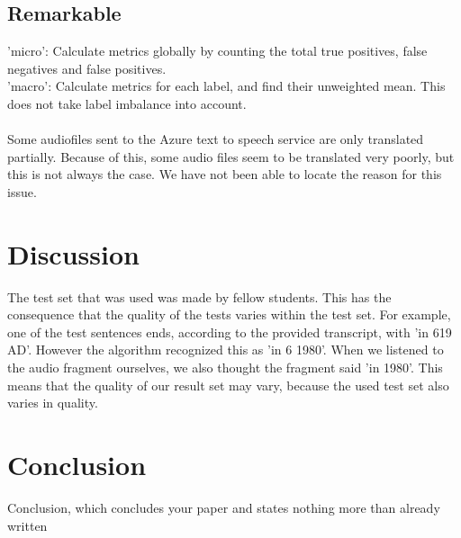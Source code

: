 \documentclass{article}
\begin{document}
\subsection{Remarkable}
    'micro': Calculate metrics globally by counting the total true positives, false negatives and false positives. \\
    'macro': Calculate metrics for each label, and find their unweighted mean. This does not take label imbalance into account. \\ \\
    Some audiofiles sent to the Azure text to speech service are only translated partially. Because of this, some audio files seem to be translated very poorly, but this is not always the case. We have not been able to locate the reason for this issue.

\section{Discussion}
The test set that was used was made by fellow students. This has the consequence that the quality of the tests varies within the test set. For example, one of the test sentences ends, according to the provided transcript, with 'in 619 AD'. However the algorithm recognized this as 'in 6 1980'. When we listened to the audio fragment ourselves, we also thought the fragment said 'in 1980'. This means that the quality of our result set may vary, because the used test set also varies in quality.

\section{Conclusion}
Conclusion, which concludes your paper and states nothing more than already
written

 
 
\end{document}
